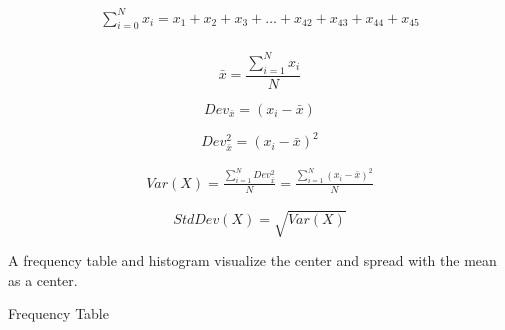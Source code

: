 \documentclass[nohyper,justified]{tufte-handout}\usepackage[]{graphicx}\usepackage[]{color}
\newcommand{\dev}[1] {Dev_{\bar{#1}}}
\begin{document}
\begin{multline*}\sum\limits_{i=0}^{N} x_i = x_1+x_2+x_3+ \dots  +x_{42}+x_{43}+x_{44}+x_{45} \\\end{multline*}


\begin{equation*}
\bar{x}=\frac{\sum\limits_{i=1}^{N} x_i }{N} 
\end{equation*}

\begin{equation*}
\dev{x}=(x_i-\bar{x}) 
\end{equation*}

\begin{equation*}
\dev{x}^2=(x_i-\bar{x})^2 
\end{equation*}

\begin{multline*}
Var(X)=\frac{\sum_{i=1}^{N} \dev{x}^2}{N}=\frac{\sum_{i=1}^{N} (x_i-\bar{x})^2}{N}
\end{multline*}

\begin{equation*}
StdDev(X)=\sqrt{Var(X)} 
\end{equation*}


\newpage
A frequency table and histogram visualize the center and spread with the mean as a center.
\begin{margintable}
\caption{Frequency Table} 
\end{margintable}
\end{document}
